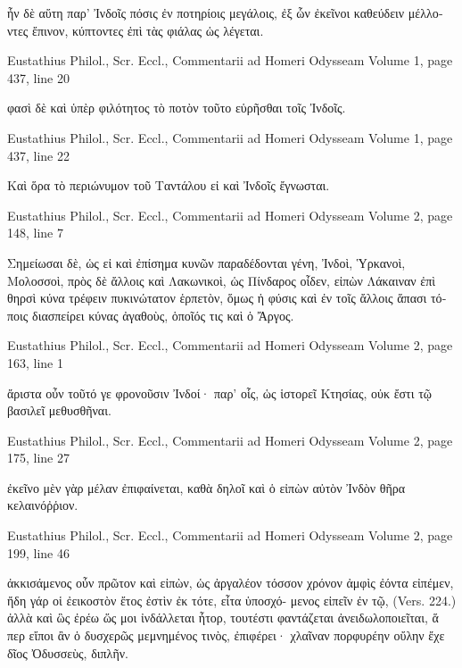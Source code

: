 \documentclass[12pt,letterpaper,twoside,final]{memoir}
\begin{document}
\begin{greek}
                                            ἦν δὲ αὕτη παρ' Ἰνδοῖς πόσις ἐν ποτηρίοις μεγάλοις, ἐξ ὧν 
ἐκεῖνοι καθεύδειν μέλλοντες ἔπινον, κύπτοντες ἐπὶ τὰς φιάλας ὡς λέγεται. 



Eustathius Philol., Scr. Eccl., Commentarii ad Homeri Odysseam 
Volume 1, page 437, line 20

                                                                                      φασὶ δὲ καὶ ὑπὲρ φιλότητος 
τὸ ποτὸν τοῦτο εὑρῆσθαι τοῖς Ἰνδοῖς. 



Eustathius Philol., Scr. Eccl., Commentarii ad Homeri Odysseam 
Volume 1, page 437, line 22

                                                                                                             Καὶ ὅρα τὸ 
περιώνυμον τοῦ Ταντάλου εἰ καὶ Ἰνδοῖς ἔγνωσται. 



Eustathius Philol., Scr. Eccl., Commentarii ad Homeri Odysseam 
Volume 2, page 148, line 7

                                                                                         Σημείωσαι δὲ, ὡς εἰ καὶ 
ἐπίσημα κυνῶν παραδέδονται γένη, Ἰνδοὶ, Ὑρκανοὶ, Μολοσσοὶ, πρὸς δὲ ἄλλοις καὶ Λακωνικοὶ, ὡς 
Πίνδαρος οἶδεν, εἰπὼν Λάκαιναν ἐπὶ θηρσὶ κύνα τρέφειν πυκινώτατον ἑρπετὸν, ὅμως ἡ φύσις καὶ ἐν 
τοῖς ἄλλοις ἅπασι τόποις διασπείρει κύνας ἀγαθοὺς, ὁποῖός τις καὶ ὁ Ἄργος. 



Eustathius Philol., Scr. Eccl., Commentarii ad Homeri Odysseam 
Volume 2, page 163, line 1

            ἄριστα οὖν τοῦτό γε φρονοῦσιν Ἰνδοί· παρ' οἷς, ὡς ἱστορεῖ Κτησίας, οὐκ ἔστι τῷ βασιλεῖ 
μεθυσθῆναι. 



Eustathius Philol., Scr. Eccl., Commentarii ad Homeri Odysseam 
Volume 2, page 175, line 27

                                       ἐκεῖνο μὲν γὰρ μέλαν ἐπιφαίνεται, καθὰ δηλοῖ καὶ ὁ εἰπὼν αὐτὸν 
Ἰνδὸν θῆρα κελαινόῤῥιον. 



Eustathius Philol., Scr. Eccl., Commentarii ad Homeri Odysseam 
Volume 2, page 199, line 46

                                                                            ἀκκισάμενος οὖν πρῶτον καὶ εἰπὼν, 
ὡς ἀργαλέον τόσσον χρόνον ἀμφὶς ἐόντα εἰπέμεν, ἤδη γάρ οἱ ἐεικοστὸν ἔτος ἐστὶν ἐκ τότε, εἶτα ὑποσχό-
μενος εἰπεῖν ἐν τῷ, (Vers. 224.) ἀλλὰ καὶ ὣς ἐρέω ὥς μοι ἰνδάλλεται ἦτορ, τουτέστι φαντάζεται   
ἀνειδωλοποιεῖται, ἅ περ εἴποι ἂν ὁ δυσχερῶς μεμνημένος τινὸς, ἐπιφέρει· χλαῖναν πορφυρέην οὔλην 
ἔχε δῖος Ὀδυσσεὺς, διπλῆν. 




\end{greek}
\end{document}
